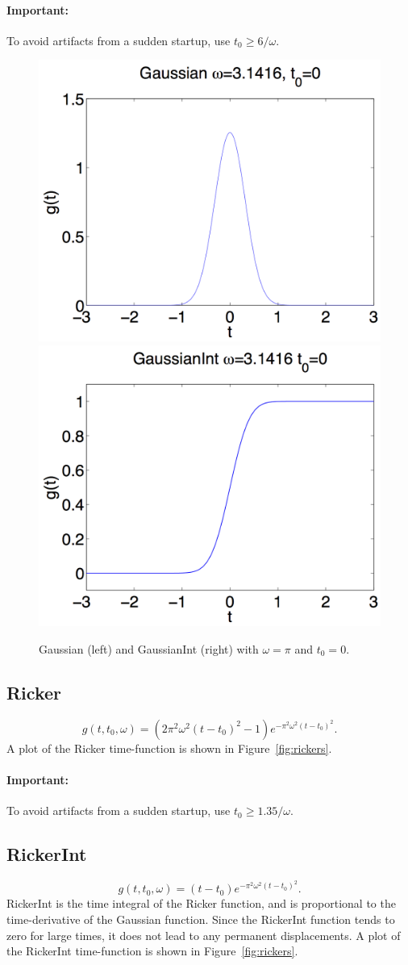 \documentclass[11pt]{report}
\begin{document}
\paragraph{Important:} To avoid artifacts from a sudden startup, use
$t_0 \geq 6/\omega$.
\begin{figure}
\begin{centering}
  \includegraphics[width=0.4\linewidth]{figures/f1-gaussian.png}
  \includegraphics[width=0.4\linewidth]{figures/f2-gaussianint.png}
  \caption{Gaussian (left) and GaussianInt (right) with $\omega=\pi$ and $t_0=0$.}
  \label{fig:gaussians}
\end{centering}
\end{figure}  
%
\subsection{Ricker} \label{ricker}
  \[
  g(t,t_0,\omega) = \left(2 \pi^2 \omega^2 (t - t_0)^2 - 1\right) e^{- \pi^2 \omega^2 (t - t_0)^2}.
  \]
A plot of the Ricker time-function is shown in Figure~\ref{fig:rickers}.

\paragraph{Important:} To avoid artifacts from a sudden startup, use
$t_0 \geq 1.35/\omega$.

\subsection{RickerInt}\label{rickerint}
  \[
  g(t,t_0,\omega) = (t - t_0) e^{- \pi^2 \omega^2 (t - t_0)^2}.
  \]
RickerInt is the time integral of the Ricker function, and is proportional to the time-derivative of
the Gaussian function. Since the RickerInt function tends to zero for large times, it does not lead
to any permanent displacements. A plot of the RickerInt time-function is shown in
Figure~\ref{fig:rickers}.
\end{document}

